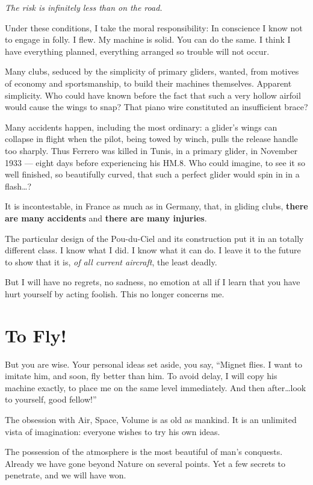 \documentclass{book}
\begin{document}
\textit{The risk is infinitely less than on the road.}

Under these conditions, I take the moral responsibility: In conscience
I know not to engage in folly. I flew. My machine is solid. You can do
the same. I think I have everything planned, everything arranged so
trouble will not occur.

Many clubs, seduced by the simplicity of primary gliders, wanted, from
motives of economy and sportsmanship, to build their machines
themselves.  Apparent simplicity. Who could have known before the fact
that such a very hollow airfoil would cause the wings to snap?  That
piano wire constituted an insufficient brace?

Many accidents happen, including the most ordinary: a glider's wings
can collapse in flight when the pilot, being towed by winch, pulls the
release handle too sharply.  Thus Ferrero was killed in Tunis, in a
primary glider, in November 1933 --- eight days before experiencing
his HM.8.  Who could imagine, to see it so well finished, so
beautifully curved, that such a perfect glider would spin in in a
flash\ldots?

It is incontestable, in France as much as in Germany, that, in gliding
clubs, \textbf{there are many accidents} and \textbf{there are many
  injuries}.

The particular design of the Pou-du-Ciel and its construction put it
in an totally different class. I know what I did. I know what it can
do. I leave it to the future to show that it is, \textit{of all
  current aircraft}, the least deadly.

But I will have no regrets, no sadness, no emotion at all if I learn
that you have hurt yourself by acting foolish. This no longer concerns
me.

\section{To Fly!}

But you are wise. Your personal ideas set aside, you say, ``Mignet
flies. I want to imitate him, and soon, fly better than him. To avoid
delay, I will copy his machine exactly, to place me on the same level
immediately. And then after\ldots look to yourself, good fellow!''

The obsession with Air, Space, Volume is as old as mankind. It is an
unlimited vista of imagination: everyone wishes to try his own ideas.

The possession of the atmosphere is the most beautiful of man's
conquests.  Already we have gone beyond Nature on several points. Yet
a few secrets to penetrate, and we will have won.
\end{document}
